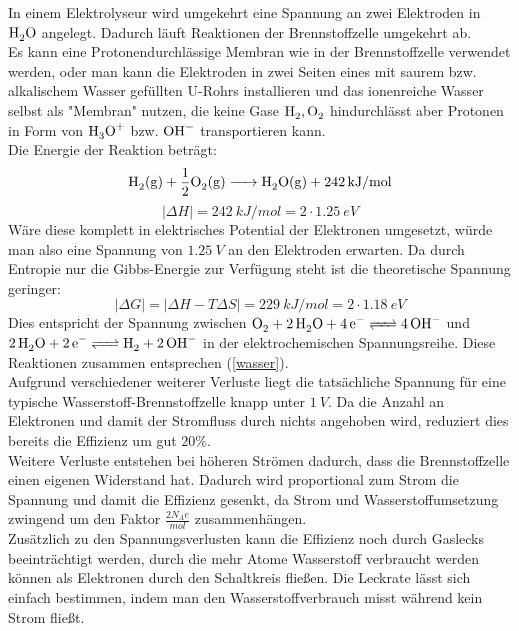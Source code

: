 \documentclass[a4paper,12pt,bibtotocnumbered]{scrartcl}
\numberwithin{equation}{section} %
\begin{document}
In einem Elektrolyseur wird umgekehrt eine Spannung an zwei Elektroden in $\ce{H_2O}$ angelegt. Dadurch läuft Reaktionen der Brennstoffzelle umgekehrt ab. \\
Es kann eine Protonendurchlässige Membran wie in der Brennstoffzelle verwendet werden, oder man kann die Elektroden in zwei Seiten eines mit saurem bzw. alkalischem Wasser gefüllten U-Rohrs installieren und das ionenreiche Wasser selbst als "Membran" nutzen, die keine Gase $\ce{H_2},\ce{O_2}$ hindurchlässt aber Protonen in Form von $\ce{H_3O^+}$ bzw. $\ce{OH^-}$ transportieren kann.\\
\newpage
Die Energie der Reaktion beträgt:
\begin{equation}
\ce{H_2(g) + \frac{1}{2}O_2(g) -> H_2O(g) + \SI{242}{kJ\per mol}}
\end{equation}\begin{equation}
|\Delta H| = \SI{242}{kJ\per mol} = 2\cdot\SI{1,25}{eV}
\end{equation}
Wäre diese komplett in elektrisches Potential der Elektronen umgesetzt, würde man also eine Spannung von $\SI{1,25}{V}$ an den Elektroden erwarten. Da durch Entropie nur die Gibbs-Energie zur Verfügung steht ist die theoretische Spannung geringer: 
\begin{equation}
|\Delta G| = |\Delta H - T \Delta S| = \SI{229}{kJ\per mol} = 2\cdot\SI{1,18}{eV}
\end{equation}
Dies entspricht der Spannung zwischen $\ce{O_2 + 2H_2O + 4e- <=> 4OH^-}$ und $\ce{2H_2O +2e- <=>H_2 + 2OH-}$ in der elektrochemischen Spannungsreihe. Diese Reaktionen zusammen entsprechen (\ref{wasser}).\\
Aufgrund verschiedener weiterer Verluste liegt die tatsächliche Spannung für eine typische Wasserstoff-Brennstoffzelle knapp unter $\SI{1}{V}$. Da die Anzahl an Elektronen und damit der Stromfluss durch nichts angehoben wird, reduziert dies bereits die Effizienz um gut $20\%$.\\
Weitere Verluste entstehen bei höheren Strömen dadurch, dass die Brennstoffzelle einen eigenen Widerstand hat. Dadurch wird proportional zum Strom die Spannung und damit die Effizienz gesenkt, da Strom und Wasserstoffumsetzung zwingend um den Faktor $\frac{2N_A e}{\si{mol}}$ zusammenhängen.\\
Zusätzlich zu den Spannungsverlusten kann die Effizienz noch durch Gaslecks beeinträchtigt werden, durch die mehr Atome Wasserstoff verbraucht werden können als Elektronen durch den Schaltkreis fließen. Die Leckrate lässt sich einfach bestimmen, indem man den Wasserstoffverbrauch misst während kein Strom fließt.\\
\end{document}
